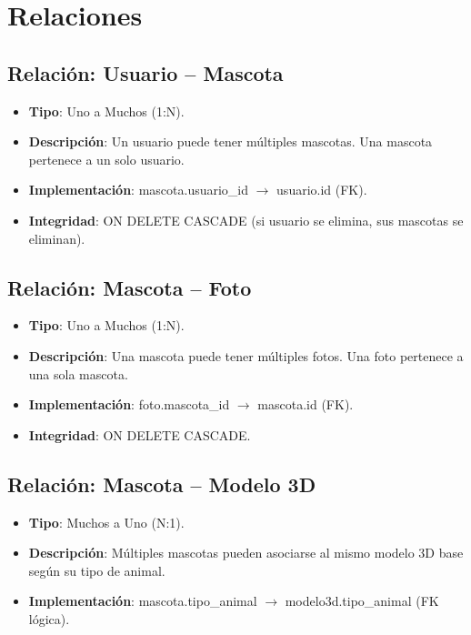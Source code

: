 \documentclass[12pt,a4paper]{article}
\begin{document}
\section{Relaciones}

\subsection{Relaci\'on: Usuario -- Mascota}
\begin{itemize}[leftmargin=*]
    \item \textbf{Tipo}: Uno a Muchos (1:N).
    \item \textbf{Descripci\'on}: Un usuario puede tener m\'ultiples mascotas. Una mascota pertenece a un solo usuario.
    \item \textbf{Implementaci\'on}: mascota.usuario\_id $\rightarrow$ usuario.id (FK).
    \item \textbf{Integridad}: ON DELETE CASCADE (si usuario se elimina, sus mascotas se eliminan).
\end{itemize}

\subsection{Relaci\'on: Mascota -- Foto}
\begin{itemize}[leftmargin=*]
    \item \textbf{Tipo}: Uno a Muchos (1:N).
    \item \textbf{Descripci\'on}: Una mascota puede tener m\'ultiples fotos. Una foto pertenece a una sola mascota.
    \item \textbf{Implementaci\'on}: foto.mascota\_id $\rightarrow$ mascota.id (FK).
    \item \textbf{Integridad}: ON DELETE CASCADE.
\end{itemize}

\subsection{Relaci\'on: Mascota -- Modelo 3D}
\begin{itemize}[leftmargin=*]
    \item \textbf{Tipo}: Muchos a Uno (N:1).
    \item \textbf{Descripci\'on}: M\'ultiples mascotas pueden asociarse al mismo modelo 3D base seg\'un su tipo de animal.
    \item \textbf{Implementaci\'on}: mascota.tipo\_animal $\rightarrow$ modelo3d.tipo\_animal (FK l\'ogica).
\end{itemize}
\end{document}
